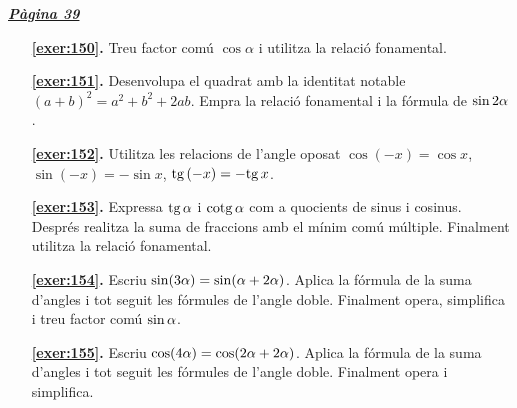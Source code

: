
\hyperlink{page.39}{\textbf{\em Pàgina 39}}
\begin{enumerate}
\item[\fontfamily{phv}\selectfont\color{blue}\textbf{\ref{exer:150}. }] \label{ans:150} 
Treu factor comú $\cos \alpha $ i utilitza la relació fonamental.
 \end{enumerate}
\begin{enumerate}
\item[\fontfamily{phv}\selectfont\color{blue}\textbf{\ref{exer:151}. }] \label{ans:151} 
Desenvolupa el quadrat amb la identitat notable $(a+b)^2 = a^2 + b^2 + 2ab$. Empra la relació fonamental i la fórmula de $\sin 2\alpha $.
\item[\fontfamily{phv}\selectfont\color{blue}\textbf{\ref{exer:152}. }] \label{ans:152} 
Utilitza les relacions de l'angle oposat $\cos (-x)=\cos x$, $\sin (-x)=-\sin x$, $\mathrm{tg}\, (-x)=-\mathrm{tg}\, x$.
\item[\fontfamily{phv}\selectfont\color{blue}\textbf{\ref{exer:153}. }] \label{ans:153} 
Expressa $\mathrm{tg}\, \alpha $ i $\mathrm{cotg}\, \alpha $ com a quocients de sinus i cosinus. Després realitza la suma de fraccions amb el mínim comú múltiple. Finalment utilitza la relació fonamental.
\item[\fontfamily{phv}\selectfont\color{blue}\textbf{\ref{exer:154}. }] \label{ans:154} 
Escriu $\sin (3\alpha ) = \sin (\alpha +2\alpha )$. Aplica la fórmula de la suma d'angles i tot seguit les fórmules de l'angle doble. Finalment opera, simplifica i treu factor comú $\sin \alpha $.
\item[\fontfamily{phv}\selectfont\color{blue}\textbf{\ref{exer:155}. }] \label{ans:155} 
Escriu $\cos (4\alpha ) = \cos (2\alpha +2\alpha )$. Aplica la fórmula de la suma d'angles i tot seguit les fórmules de l'angle doble. Finalment opera i simplifica.
 \end{enumerate}
\vspace{0.3cm}


